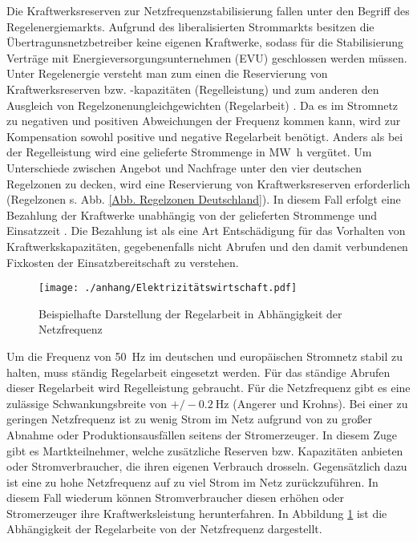 		Die Kraftwerksreserven zur Netzfrequenzstabilisierung fallen unter den Begriff des Regelenergiemarkts.
		Aufgrund des liberalisierten Strommarkts besitzen die Übertragunsnetzbetreiber keine eigenen Kraftwerke, sodass für die Stabilisierung Verträge mit Energieversorgungsunternehmen (EVU) geschlossen werden müssen. \\
			
		Unter Regelenergie versteht man zum einen die Reservierung von Kraftwerksreserven bzw. -kapazitäten (Regelleistung) und zum anderen den Ausgleich von Regelzonenungleichgewichten (Regelarbeit) \parencite{Elektrizitätswirtschaft}.
		Da es im Stromnetz zu negativen und positiven Abweichungen der Frequenz kommen kann, wird zur Kompensation sowohl positive und negative Regelarbeit benötigt.
		Anders als bei der Regelleistung wird eine gelieferte Strommenge in \si{\mega\watt\hour} vergütet.
		Um Unterschiede zwischen Angebot und Nachfrage unter den vier deutschen Regelzonen zu decken, wird eine Reservierung von Kraftwerksreserven erforderlich (Regelzonen s. Abb. \ref{Abb. Regelzonen Deutschland}). 
		In diesem Fall erfolgt eine Bezahlung der Kraftwerke unabhängig von der gelieferten Strommenge und Einsatzzeit \parencite{Elektrizitätswirtschaft}. 
		Die Bezahlung ist als eine Art Entschädigung für das Vorhalten von Kraftwerkskapazitäten, gegebenenfalls nicht Abrufen und den damit verbundenen Fixkosten der Einsatzbereitschaft zu verstehen.   
		
		\begin{figure} [H]
			\centering
			\label{Abb. Beispielhafte Darstellung der Regelenergie in Abhängigkeit der Netzfrequenz}
			\texttt{[image: ./anhang/Elektrizitätswirtschaft.pdf]}
			\caption{Beispielhafte Darstellung der Regelarbeit in Abhängigkeit der Netzfrequenz \parencite{Elektrizitätswirtschaft}}
		\end{figure}
	
		Um die Frequenz von \SI{50}{\hertz} im deutschen und europäischen Stromnetz stabil zu halten, muss ständig Regelarbeit eingesetzt werden.
		Für das ständige Abrufen dieser Regelarbeit wird Regelleistung gebraucht.
		Für die Netzfrequenz gibt es eine zulässige Schwankungsbreite von $+/-\SI{0,2}{\hertz}$ (Angerer und Krohns).
		Bei einer zu geringen Netzfrequenz ist zu wenig Strom im Netz aufgrund von zu großer Abnahme oder Produktionsausfällen seitens der Stromerzeuger.
		In diesem Zuge gibt es Martkteilnehmer, welche zusätzliche Reserven bzw. Kapazitäten anbieten oder Stromverbraucher, die ihren eigenen Verbrauch drosseln.
		Gegensätzlich dazu ist eine zu hohe Netzfrequenz auf zu viel Strom im Netz zurückzuführen. 
		In diesem Fall wiederum können Stromverbraucher diesen erhöhen oder Stromerzeuger ihre Kraftwerksleistung herunterfahren. 
		In Abbildung \ref{Abb. Beispielhafte Darstellung der Regelenergie in Abhängigkeit der Netzfrequenz} ist die Abhängigkeit der Regelarbeite von der Netzfrequenz dargestellt. \\
		
